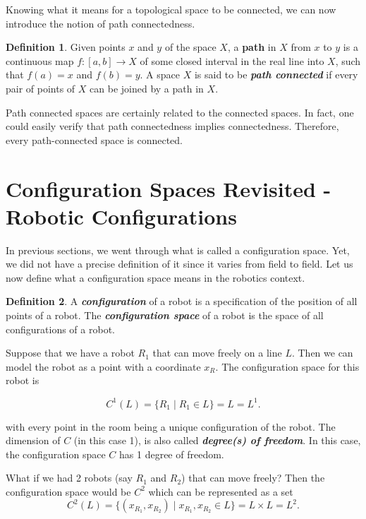 \documentclass[a4paper, twocolumn]{article}
\theoremstyle{definition}
\newtheorem*{definition}{Definition}
\begin{document}
\medskip

Knowing what it means for a topological space to be connected, we can now introduce the notion
of path connectedness.

\begin{definition}
\cite{9} Given points $x$ and $y$ of the space $X$, a \textbf{path} in $X$ from $x$ to $y$ is a 
continuous map $f : [a, b] \to X$ of some closed interval in the real line into $X$, such
that $f(a) = x$ and $f(b) = y$. A space $X$ is said to be \textit{\textbf{path connected}} if every pair of
points of $X$ can be joined by a path in $X$.
\end{definition}

Path connected spaces are certainly related to the connected spaces.
In fact, one could easily verify that path connectedness implies connectedness.
Therefore, every path-connected space is connected.


\section*{Configuration Spaces Revisited - Robotic Configurations}
In previous sections, we went through what is called a configuration space.
Yet, we did not have a precise definition of it since it varies from field to field.
Let us now define what a configuration space means in the robotics context.

\begin{definition}
\cite{10} A \textit{\textbf{configuration}} of a robot is a specification of the position of all points of a robot.
The \textit{\textbf{configuration space}} of a robot is the space of all configurations of a robot.
\end{definition}

Suppose that we have a robot $R_1$ that can move freely on a line $L$. Then we can model the robot as
a point with a coordinate $x_R$. The configuration space for this robot is

$$C^1(L) = \{R_1 \mid R_1 \in L\} = L = L^1.$$

with every point in the room being a unique configuration of the robot.
The dimension of $C$ (in this case 1), is also called \textit{\textbf{degree(s) of freedom}}.
In this case, the configuration space $C$ has 1 degree of freedom.

\medskip

What if we had 2 robots (say $R_1$ and $R_2$) that can move freely?
Then the configuration space would be $C^2$ which can be represented as a set
$$C^2(L) = \{(x_{R_1}, x_{R_2}) \mid x_{R_1}, x_{R_2} \in L\} = L \times L = L^2.$$
\end{document}
